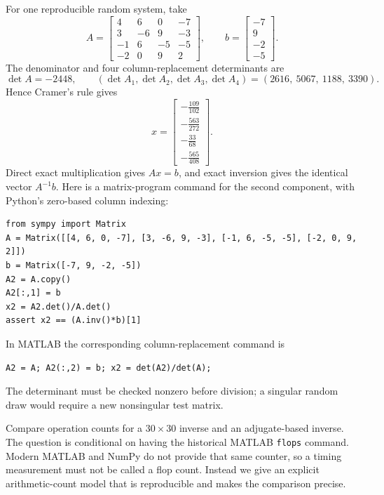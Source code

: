 For one reproducible random system, take
\[A=\begin{bmatrix}4&6&0&-7\\3&-6&9&-3\\-1&6&-5&-5\\-2&0&9&2\end{bmatrix},\qquad b=\begin{bmatrix}-7\\9\\-2\\-5\end{bmatrix}.\]
The denominator and four column-replacement determinants are
\[
\det A=-2448,\qquad
(\det A_1,\det A_2,\det A_3,\det A_4)=\left( 2616, \  5067, \  1188, \  3390\right).
\]
Hence Cramer's rule gives
\[x=\begin{bmatrix}- \frac{109}{102}\\- \frac{563}{272}\\- \frac{33}{68}\\- \frac{565}{408}\end{bmatrix}.\]
Direct exact multiplication gives $Ax=b$, and exact inversion gives the identical vector $A^{-1}b$. Here is a matrix-program command for the second component, with Python's zero-based column indexing:
\begin{verbatim}
from sympy import Matrix
A = Matrix([[4, 6, 0, -7], [3, -6, 9, -3], [-1, 6, -5, -5], [-2, 0, 9, 2]])
b = Matrix([-7, 9, -2, -5])
A2 = A.copy()
A2[:,1] = b
x2 = A2.det()/A.det()
assert x2 == (A.inv()*b)[1]
\end{verbatim}
In MATLAB the corresponding column-replacement command is
\begin{verbatim}
A2 = A; A2(:,2) = b; x2 = det(A2)/det(A);
\end{verbatim}
The determinant must be checked nonzero before division; a singular random draw would require a new nonsingular test matrix.

\goal Compare operation counts for a $30\times30$ inverse and an adjugate-based inverse.
The question is conditional on having the historical MATLAB \texttt{flops} command. Modern MATLAB and NumPy do not provide that same counter, so a timing measurement must not be called a flop count. Instead we give an explicit arithmetic-count model that is reproducible and makes the comparison precise.

